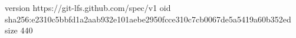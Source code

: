 version https://git-lfs.github.com/spec/v1
oid sha256:e2310c5bbfd1a2aab932e101aebe2950fcce310c7cb0067de5a5419a60b352ed
size 440

